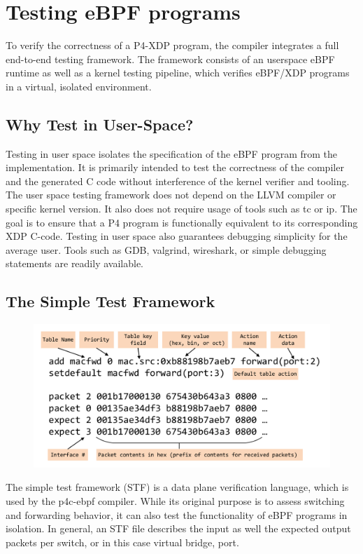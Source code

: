 \section{Testing eBPF programs}\label{sec:testing}
To verify the correctness of a P4-XDP program, the compiler integrates a full 
end-to-end testing framework. The framework consists of an userspace eBPF 
runtime as well as a kernel testing pipeline, which verifies eBPF/XDP programs 
in a virtual, isolated environment.

\subsection{Why Test in User-Space?}
Testing in user space isolates the specification of the eBPF program from the 
implementation. It is primarily intended to test the correctness of the 
compiler and the generated C code without interference of the kernel verifier 
and tooling. The user space testing framework does not depend on the LLVM 
compiler or specific kernel version. It also does not require usage of tools 
such as tc or ip. The goal is to ensure that a P4 program is functionally 
equivalent to its corresponding XDP C-code.
Testing in user space also guarantees debugging simplicity for the average 
user. Tools such as GDB, valgrind, wireshark, or simple debugging statements 
are readily available.
 
\subsection{The Simple Test Framework}
\begin{figure}
	\centering
	\includegraphics[width=0.7\linewidth]{stf}
	\caption{}
	\label{fig:stf}
\end{figure}
The simple test framework (STF) is a data plane verification language, which is 
used by the p4c-ebpf compiler. While its original purpose is to assess 
switching and 
forwarding behavior, it can also test the functionality of eBPF programs in 
isolation.
In general, an STF file describes the input as well the expected output 
packets per switch, or in this case virtual bridge, port.

